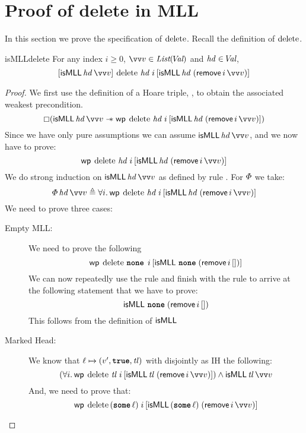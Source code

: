 \documentclass[thesis.tex]{subfiles}
\begin{document}
\section{Proof of delete in MLL}
\label{sec:proofmll}
In this section we prove the specification of $\operatorname{delete}$. Recall the definition of $\operatorname{delete}$.
\MLLDeleteProg
\\
\begin{lemma}{}{isMLLdelete}
    For any index $i \ge 0$, $\vect{\val} \in \List(\Val)$  and $\mathit{hd}\in\kern-0.2em\textit{Val}$,
    \[
        \hoare{\isMLL\, \hd\, \vect{\val}}{\MLLdelete\, \hd\; \iindex }{\isMLL\, \hd\; (\textlog{remove}\, \iindex\, \vect{v})}
    \]
\end{lemma}
\begin{proof}
    We first use the definition of a Hoare triple, , to obtain the associated weakest precondition.
    \[\always(\isMLL\, \hd\, \vect{\val} \wand \wpre{\MLLdelete\, \hd\; \iindex}{\isMLL\, \hd\; (\textlog{remove}\, \iindex\, \vect{v})})\]
    Since we have only pure assumptions we can assume
    $\isMLL\, \hd\, \vect{\val}$, and we now have to prove:
    \[\wpre{\MLLdelete\, \hd\; \iindex}{\isMLL\, \hd\; (\textlog{remove}\, \iindex\, \vect{v})}\]
    We do strong induction on $\isMLL\, \hd\, \vect{\val}$ as defined by rule . For $\varPhi$ we take:
    \[
        \pred\, \hd\, \vect{\val} \eqdef \All \iindex. \wpre{\MLLdelete\, \hd\; \iindex}{\isMLL\, \hd\; (\textlog{remove}\, \iindex\, \vect{v})}
    \]
    We need to prove three cases:
    \begin{description}
        \item[Empty MLL:] We need to prove the following
              \[\wpre{\MLLdelete\, \None\; \iindex}{\isMLL\, \None\; (\textlog{remove}\, \iindex\, [])}\]
              We can now repeatedly use the  rule and finish with the rule  to arrive at the following statement that we have to prove:
              \[\textsf{\upshape isMLL}\, \operatorname{\texttt{\upshape \bfseries none}}\; (\textsf{\upshape remove}\, i\, [])\]
              This follows from the definition of $\textsf{\upshape isMLL}$
        \item[Marked Head:] We know that $\loc \fmapsto (\val', \True, \tl)$ with disjointly as IH the following:
              \[\left(\All \iindex. \wpre{\MLLdelete\, \tl\; \iindex}{\isMLL\, \tl\; (\textlog{remove}\, \iindex\, \vect{\val})}\right) \land \isMLL\, \tl\, \vect{\val}\]
              And, we need to prove that:
              \[\wpre{\MLLdelete\, (\Some \loc)\; \iindex}{\isMLL\, (\Some \loc)\; (\textlog{remove}\, \iindex\, \vect{v})}\]

\end{description}
\end{proof}
\end{document}
